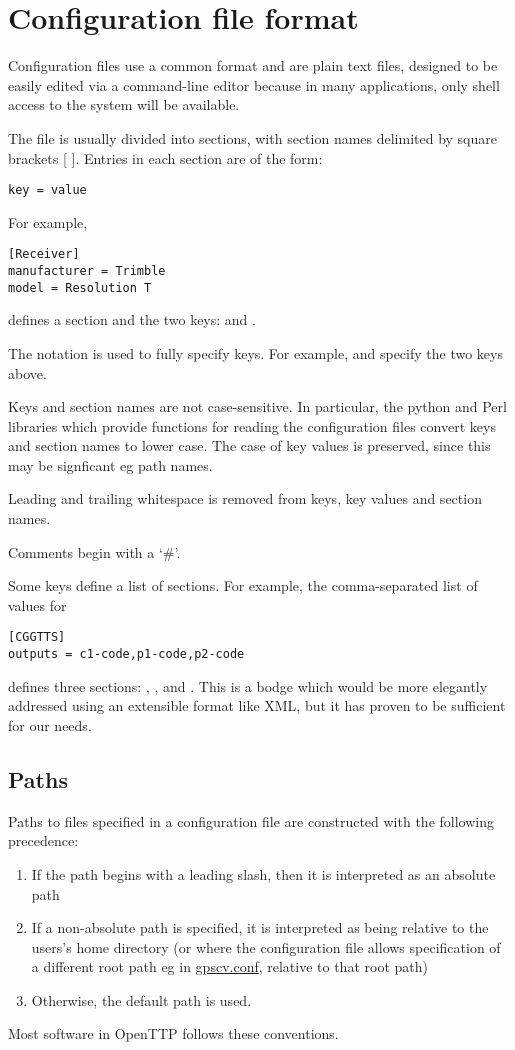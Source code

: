 \section{Configuration file format \label{sConfigFileFormat}}

Configuration files use a common format and are plain text files, designed to be easily edited via a command-line
editor because in many applications, only shell access to the system will be available.

The file is usually divided into sections, with section names delimited by square brackets [ ]. Entries in each section
are of the form:
\begin{lstlisting}
key = value
\end{lstlisting}
For example,
\begin{lstlisting}
[Receiver]
manufacturer = Trimble
model = Resolution T
\end{lstlisting}
defines a section  and the two keys:  and . 

The notation  is used to fully specify keys. For example,
 and  specify the two keys above.

Keys and section names are not case-sensitive. In particular, the python and Perl libraries
which provide functions for reading the configuration files convert keys and section names to lower case.
The case of key values is preserved, since this may be signficant eg path names.

Leading and trailing whitespace is removed from keys, key values and section names.

Comments begin with a `\#'. 

Some keys define a list of sections. 
For example, the comma-separated list of values for  
\begin{lstlisting}
[CGGTTS]
outputs = c1-code,p1-code,p2-code
\end{lstlisting}
defines three sections: , , and .
This is a bodge which would be more elegantly addressed using an extensible format like XML, 
but it has proven to be sufficient for our needs.

\subsection{Paths} \label{s:ConfigFilePaths}

Paths to files  specified in a configuration file are constructed with the following 
precedence:
\begin{enumerate}
\item If the path begins with a leading slash, then it is interpreted as an absolute path
\item If a non-absolute path is specified, it is interpreted as being relative to 
	the users's home directory (or where the configuration file allows specification of a different root path eg in \hyperlink{h:rootpath}{gpscv.conf}, relative to that root path) 
\item Otherwise, the default path is used.
\end{enumerate}
Most software in OpenTTP follows these conventions.

